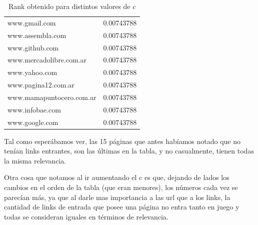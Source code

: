 \begin{table}
\begin{center}
{\begin{tabular}{ l | c }
www.gmail.com & 0.00743788 \\
www.assembla.com & 0.00743788 \\
www.github.com & 0.00743788 \\
www.mercadolibre.com.ar & 0.00743788 \\
www.yahoo.com & 0.00743788 \\
www.pagina12.com.ar & 0.00743788 \\
www.mamapuntocero.com.ar & 0.00743788 \\
www.infobae.com & 0.00743788 \\
www.google.com & 0.00743788 \\
\hline
\end{tabular}
}

\caption{Rank obtenido para distintos valores de $c$}
\end{center}\end{table}

Tal como esper\'abamos ver, las 15 p\'aginas que antes hab\'iamos notado que no ten\'ian links entrantes, son las \'ultimas
en la tabla, y no casualmente, tienen todas la misma relevancia.

Otra cosa que notamos al ir aumentando el c es que, dejando de lados los cambios en el orden de la tabla (que eran menores),
los n\'umeros cada vez se parec\'ian m\'as, ya que al darle mas importancia a las url que a los links, la cantidad
de links de entrada que posee una p\'agina no entra tanto en juego y todas se consideran iguales en t\'erminos de relevancia.
